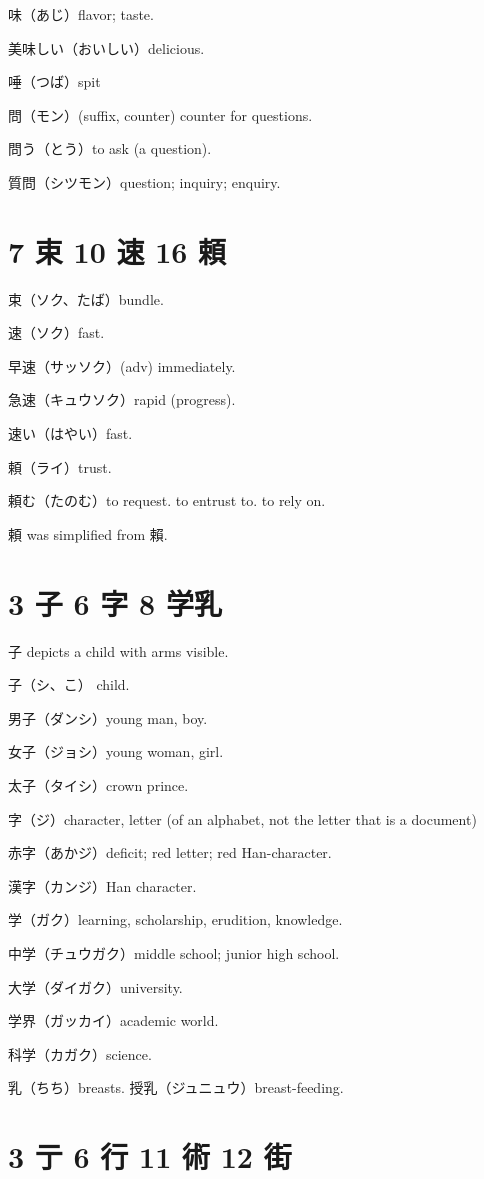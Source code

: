 味（あじ）flavor; taste.

美味しい（おいしい）delicious.

唾（つば）spit

問（モン）(suffix, counter) counter for questions.

問う（とう）to ask (a question).

質問（シツモン）question; inquiry; enquiry.

\section{7 束 10 速 16 頼}

束（ソク、たば）bundle.

速（ソク）fast.

早速（サッソク）(adv) immediately.

急速（キュウソク）rapid (progress).

速い（はやい）fast.

頼（ライ）trust.

頼む（たのむ）to request. to entrust to. to rely on.

頼 was simplified from 賴.

\section{3 子 6 字 8 学乳}

子 depicts a child with arms visible.

子（シ、こ） child.

男子（ダンシ）young man, boy.

女子（ジョシ）young woman, girl.

太子（タイシ）crown prince.

字（ジ）character, letter (of an alphabet, not the letter that is a document)

赤字（あかジ）deficit; red letter; red Han-character.

漢字（カンジ）Han character.

学（ガク）learning, scholarship, erudition, knowledge.

中学（チュウガク）middle school; junior high school.

大学（ダイガク）university.

学界（ガッカイ）academic world.

科学（カガク）science.

乳（ちち）breasts.
授乳（ジュニュウ）breast-feeding.

\section{3 亍 6 行 11 術 12 街}

